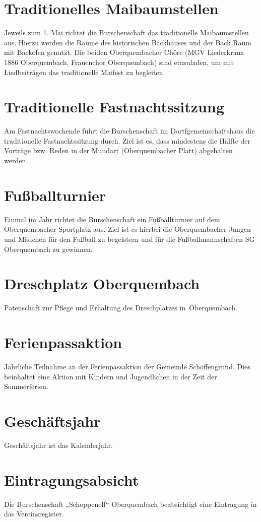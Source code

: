\section{Traditionelles Maibaumstellen}
Jeweils zum 1. Mai richtet die Burschenschaft das traditionelle Maibaumstellen aus. Hierzu werden die Räume des historischen Backhauses und der Back Raum mit Backofen genutzt. Die beiden Oberquembacher Chöre (MGV Liederkranz 1886 Oberquembach, Frauenchor Oberquembach) sind einzuladen, um mit Liedbeiträgen das traditionelle Maifest zu begleiten.

\section{Traditionelle Fastnachtssitzung}
Am Fastnachtswochende  führt die Burschenschaft im Dortfgemeinschaftshaus die traditionelle Fastnachtssitzung durch. Ziel ist es, dass mindestens  die Hälfte der Vorträge bzw. Reden in der Mundart (Oberquembacher Platt) abgehalten werden.

\section{Fußballturnier}
Einmal im Jahr richtet die Burschenschaft ein Fußballturnier auf dem Oberquembacher Sportplatz aus.
Ziel ist es hierbei die Oberquembacher Jungen und Mädchen für den Fußball zu begeistern und für die Fußballmannschaften SG Oberquembach zu gewinnen.

\section{Dreschplatz Oberquembach}
Patenschaft zur Pflege und Erhaltung des Dreschplatzes in Oberquembach.

\section{Ferienpassaktion}
Jährliche Teilnahme an der Ferienpassaktion der Gemeinde Schöffengrund. Dies beinhaltet eine Aktion mit Kindern und Jugendlichen in der Zeit der Sommerferien.

\section{Geschäftsjahr}
Geschäftsjahr ist das Kalenderjahr.

\section{Eintragungsabsicht}
Die Burschenschaft „Schoppenelf“ Oberquembach beabsichtigt eine Eintragung in das Vereinsregister.

